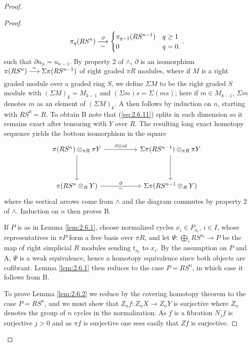 \documentclass[../main]{subfiles}
\begin{document}
\begin{proof}
\begin{proof}
\[ 
    \pi_q (RS^{n}) \varrightarrow[\sim]{\partial} 
\begin{cases}
\pi_{q-1} (RS^{n-1}) & q \geq 1 \\
0 & q = 0 
.\end{cases}
.\]
such that $\partial u_n=u_{n-1}$. By property 2 of $\wedge$, $\partial$ is an isomorphism \\$\pi(RS^n)\varrightarrow{\sim}\Sigma\pi(RS^{n-1})$ of right graded $\pi R$ modules, where if $M$ is a right graded module over a graded ring $S$, we define $\Sigma M$ to be the right graded $S$ module with $(\Sigma M)_k=M_{k-1}$ and $(\Sigma m)s=\Sigma(ms)$; here if $m\in M_{k-1}$, $\Sigma m$ denotes $m$ as an element of $(\Sigma M)_k$. A then follows by induction on $n$, starting with $RS^0=R$. To obtain B note that (\ref{eq:2.6.11}) splits in each dimension so it remains exact after tensoring with $Y$ over $R$. The resulting long exact homotopy sequence yields the bottom isomorphism in the square
\[\begin{tikzcd}
	{\pi (RS^n) \otimes_{\pi R} \pi Y} && {\Sigma \pi (RS^{n-1}) \otimes_{\pi R} \pi Y} \\\\
	{\pi (RS^n \otimes_R Y)} && {\Sigma \pi (RS^{n-1} \otimes_R Y)}
	\arrow[from=1-1, to=3-1]
	\arrow[from=1-3, to=3-3]
	\arrow["\partial", from=3-1, to=3-3]
	\arrow["\sim", draw=none, from=3-3, to=3-1]
	\arrow["{\partial \otimes id}", from=1-1, to=1-3]
\end{tikzcd}\]
where the vertical arrows come from $\wedge $ and the diagram commutes by property 2 of $\wedge $. Induction on $n$ then proves B.

If $P$ is as in Lemma \ref{lem:2.6.1}, choose normalized cycles $x_i\in P_{n_i}$, $i\in I$, whose representatives in $\pi P$ form a free basis over $\pi R$, and let $\Psi:\bigoplus_i RS^{n_i}\longrightarrow P$ be the map of right simplicial $R$ modules sending $t_{n_i}$ to $x_i$. By the assumption on $P$ and A, $\Psi$ is a weak equivalence, hence a homotopy equivalence since both objects are cofibrant. Lemma \ref{lem:2.6.1} then reduces to the case $P=RS^n$, in which case it follows from B.

To prove Lemma \ref{lem:2.6.2} we reduce by the covering homotopy theorem to the case $P = RS^{n}$, and we must show that $Z_n f \colon Z_n X \longrightarrow  Z_n Y$ is surjective where $Z_n$ denotes the group of $n$ cycles in the normalization. As $f$ is a fibration $N_j f$ is surjective $j > 0$ and as $\pi f$ is surjective one sees easily that $Zf$ is surjective. 
\end{proof}


\end{proof}
\end{document}

